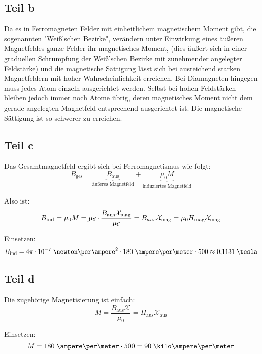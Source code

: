 \documentclass[a4paper,german,12pt,smallheadings]{scrartcl}
\begin{document}
\subsection*{Teil b}
Da es in Ferromagneten Felder mit einheitlichem magnetischem Moment gibt, die
sogenannten "Weiß'schen Bezirke", verändern unter Einwirkung eines äußeren
Magnetfeldes ganze Felder ihr magnetisches Moment, (dies äußert sich in einer
graduellen Schrumpfung der Weiß'schen Bezirke mit zunehmender angelegter
Feldstärke) und die magnetische Sättigung lässt sich bei ausreichend starken
Magnetfeldern mit hoher Wahrscheinlichkeit erreichen.  Bei Diamagneten hingegen
muss jedes Atom einzeln ausgerichtet werden. Selbst bei hohen Feldstärken
bleiben jedoch immer noch Atome übrig, deren magnetisches Moment nicht dem
gerade angelegten Magnetfeld entsprechend ausgerichtet ist. Die magnetische
Sättigung ist so schwerer zu erreichen.

\subsection*{Teil c}

Das Gesamtmagnetfeld ergibt sich bei Ferromagnetismus wie folgt:
\begin{equation*}
B_{\text{ges}}=\underbrace{B_{\text{aus}}}_{\text{äußeres Magnetfeld}}+\underbrace{\mu_0M}_{\text{induziertes Magnetfeld}}
\end{equation*}

Also ist:
\begin{align*}
B_{\text{ind}}=\mu_0M=\cancel{\mu_0} \cdot \frac{B_{\text{aus}} \mathcal{X}_{\text{mag}}}{\cancel{\mu_0}}=B_{aus}\mathcal{X}_{\text{mag}}=\mu_0H_{\text{mag}}\mathcal{X}_{\text{mag}}
\end{align*}

Einsetzen:
\begin{align*}
B_{\text{ind}} = 4 \pi \cdot 10^{-7} \;\newton\per\ampere^2 \cdot 180 \;\ampere\per\meter \cdot 500 \approx 0{,}1131 \;\tesla
\end{align*}

\subsection*{Teil d}

Die zugehörige Magnetisierung ist einfach:
\begin{equation*}
M=\frac{B_{\text{aus}}\mathcal{X}}{\mu_0}=H_{\text{aus}} \mathcal{X}_{\text{aus}}
\end{equation*}

Einsetzen:
\begin{equation*}
  M= 180 \;\ampere\per\meter \cdot 500 = 90 \;\kilo\ampere\per\meter
\end{equation*}
\end{document}

